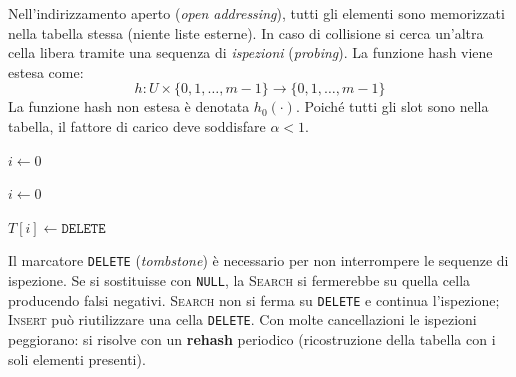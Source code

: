 \begin{softnote}
	Nell'indirizzamento aperto (\emph{open addressing}), tutti gli elementi sono
	memorizzati nella tabella stessa (niente liste esterne). In caso di
	collisione si cerca un'altra cella libera tramite una sequenza di
	\emph{ispezioni} (\emph{probing}). La funzione hash viene estesa come:
	\[
	h : U \times \{0,1,\ldots,m-1\} \to \{0,1,\ldots,m-1\}
	\]
	La funzione hash non estesa è denotata $h_0(\cdot)$. Poiché tutti gli slot
	sono nella tabella, il fattore di carico deve soddisfare $\alpha < 1$.
\end{softnote}

\begin{algorithm}[H]
	\caption{\textsc{Insert}$(T, o)$}
	$i \leftarrow 0$\;
	\;
\end{algorithm}

\begin{algorithm}[H]
	\caption{\textsc{Search}$(T, k)$}
	$i \leftarrow 0$\;
	\;
\end{algorithm}

\begin{algorithm}[H]
	\caption{\textsc{Delete}$(T, i)$}
	$T[i] \leftarrow \mathtt{DELETE}$ 
\end{algorithm}

\begin{hardnote}
	Il marcatore \texttt{DELETE} (\emph{tombstone}) è necessario per non
	interrompere le sequenze di ispezione. Se si sostituisse con \texttt{NULL},
	la \textsc{Search} si fermerebbe su quella cella producendo falsi negativi.
	\textsc{Search} non si ferma su \texttt{DELETE} e continua l'ispezione;
	\textsc{Insert} può riutilizzare una cella \texttt{DELETE}. Con molte
	cancellazioni le ispezioni peggiorano: si risolve con un \textbf{rehash}
	periodico (ricostruzione della tabella con i soli elementi presenti).
\end{hardnote}

